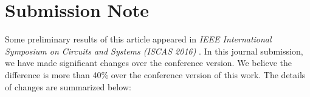 %




\section{Submission Note}


Some preliminary results of this article appeared in {\it IEEE
  International Symposium on Circuits and Systems (ISCAS 2016)
}\cite{zhao2016learning}. In this journal submission, we have made
significant changes over the conference version. We believe the
difference is more than 40\% over the conference version of this
work. The details of changes are summarized below:
